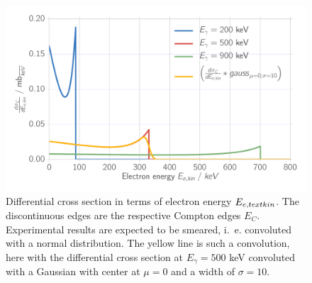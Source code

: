 \begin{figure}[htpb]
    \centering
    \includegraphics[width=0.8\linewidth]{analysis/figures/theory_dsde}
    \caption{
        Differential cross section in terms of electron energy $E_{e, \\text{kin}}$. The discontinuous edges 
        are the respective Compton edges $E_C$. Experimental results are expected to be smeared, i.~e. convoluted with a 
        normal distribution. The yellow line is such a convolution, here with the differential cross section at
        $E_\gamma = 500$ keV convoluted with a Gaussian with center at $\mu = 0$ and a width of $\sigma = 10$. 
        }
    \label{fig:theory_dsde}
\end{figure}


